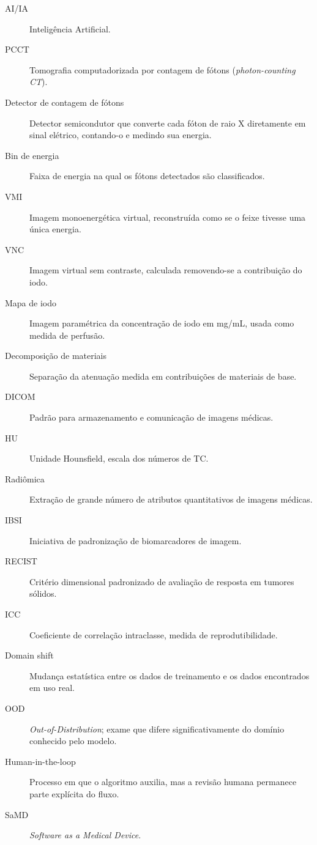 \documentclass[11pt,a4paper]{article}
\begin{document}
\begin{description}
\item[AI/IA] Inteligência Artificial.
\item[PCCT] Tomografia computadorizada por contagem de fótons (\emph{photon-counting CT}).
\item[Detector de contagem de fótons] Detector semicondutor que converte cada fóton de raio X diretamente em sinal elétrico, contando-o e medindo sua energia.
\item[Bin de energia] Faixa de energia na qual os fótons detectados são classificados.
\item[VMI] Imagem monoenergética virtual, reconstruída como se o feixe tivesse uma única energia.
\item[VNC] Imagem virtual sem contraste, calculada removendo-se a contribuição do iodo.
\item[Mapa de iodo] Imagem paramétrica da concentração de iodo em mg/mL, usada como medida de perfusão.
\item[Decomposição de materiais] Separação da atenuação medida em contribuições de materiais de base.
\item[DICOM] Padrão para armazenamento e comunicação de imagens médicas.
\item[HU] Unidade Hounsfield, escala dos números de TC.
\item[Radiômica] Extração de grande número de atributos quantitativos de imagens médicas.
\item[IBSI] Iniciativa de padronização de biomarcadores de imagem.
\item[RECIST] Critério dimensional padronizado de avaliação de resposta em tumores sólidos.
\item[ICC] Coeficiente de correlação intraclasse, medida de reprodutibilidade.
\item[Domain shift] Mudança estatística entre os dados de treinamento e os dados encontrados em uso real.
\item[OOD] \emph{Out-of-Distribution}; exame que difere significativamente do domínio conhecido pelo modelo.
\item[Human-in-the-loop] Processo em que o algoritmo auxilia, mas a revisão humana permanece parte explícita do fluxo.
\item[SaMD] \emph{Software as a Medical Device}.
\end{description}
\end{document}
